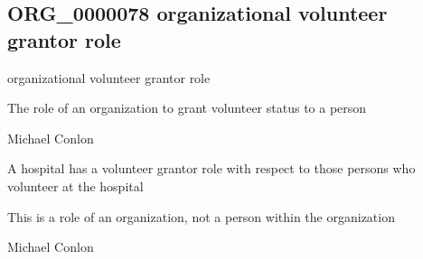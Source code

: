 \documentclass[letterpaper,10pt,english]{sphinxmanual}
\begin{document}
\subsection{ORG\_0000078 \sphinxhyphen{} organizational volunteer grantor role}
\label{\detokenize{doc-ORG_0000078:org-0000078-organizational-volunteer-grantor-role}}\label{\detokenize{doc-ORG_0000078:index-0}}\label{\detokenize{doc-ORG_0000078::doc}}
\begin{sphinxShadowBox}

\sphinxAtStartPar
organizational volunteer grantor role
\end{sphinxShadowBox}

\begin{sphinxShadowBox}

\sphinxAtStartPar
{\hyperref[\detokenize{doc-BFO_0000023::doc}]{}}
\end{sphinxShadowBox}

\begin{sphinxShadowBox}

\sphinxAtStartPar
The role of an organization to grant volunteer status to a person
\end{sphinxShadowBox}

\begin{sphinxShadowBox}

\sphinxAtStartPar
Michael Conlon 
\end{sphinxShadowBox}

\begin{sphinxShadowBox}

\sphinxAtStartPar
A hospital has a volunteer grantor role with respect to those persons who volunteer at the hospital
\end{sphinxShadowBox}

\begin{sphinxShadowBox}

\sphinxAtStartPar
This is a role of an organization, not a person within the organization
\end{sphinxShadowBox}

\begin{sphinxShadowBox}

\sphinxAtStartPar
Michael Conlon 
\end{sphinxShadowBox}
\begin{quote}

\ignorespaces \end{quote}
\end{document}

